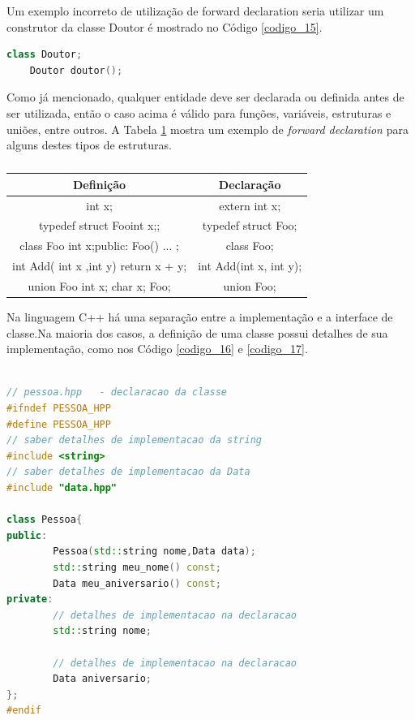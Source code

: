 Um exemplo incorreto de utilização de forward declaration seria utilizar
 um construtor da classe Doutor é mostrado no Código \ref{codigo_15}.


\begin{lstlisting}[language=C++,frame=single,title={Código 15: 
                   Uso incorreto de Forward Declaration},
                                                label=codigo_15]
    class Doutor;
    Doutor doutor();

\end{lstlisting}

Como já mencionado, qualquer entidade deve ser declarada ou definida antes
 de ser utilizada, então o caso acima é válido para funções, variáveis,
 estruturas e uniões, entre outros. A Tabela \ref{tab:tabela_03} mostra
 um exemplo de \textit{ forward declaration} para alguns destes tipos
 de estruturas.

\begin{table}[h]
    \label{tab:tabela_03}
    \caption {}
    \centering
    \begin{tabular}{ |c | c |}
    \hline
    Definição & Declaração\\
    \hline
    int x; & extern int x;\\
    \hline
    typedef struct Foo{int x;}; & typedef struct Foo;\\
    \hline
    class Foo { int x;public: Foo() ... }; & class Foo;\\
    \hline
    int Add( int x ,int  y) { return x + y; } & int Add(int x, int y);\\
    \hline
    union Foo { int x; char x; }Foo; & union Foo;\\
    \hline
    \end{tabular}
\end{table}


Na linguagem C++ há uma separação entre  a implementação e a interface de
 classe\cite{ref44}.Na maioria dos casos, a definição de uma classe possui
 detalhes de sua implementação, como nos Código \ref{codigo_16} e \ref{codigo_17}.


\begin{lstlisting}[language=C++,frame=single,title={Código 16: 
                          Arquivo declaração da classe Pessoa },
                                                label=codigo_16]

// pessoa.hpp   - declaracao da classe
#ifndef PESSOA_HPP
#define PESSOA_HPP
// saber detalhes de implementacao da string
#include <string>       
// saber detalhes de implementacao da Data
#include "data.hpp"     

class Pessoa{
public:
        Pessoa(std::string nome,Data data);
        std::string meu_nome() const;
        Data meu_aniversario() const;
private:
        // detalhes de implementacao na declaracao
        std::string nome;        

        // detalhes de implementacao na declaracao
        Data aniversario;        
};
#endif

\end{lstlisting}

